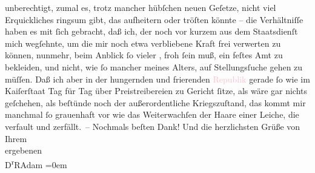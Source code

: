                    unberechtigt, zumal es, trotz mancher hübſchen neuen Geſetze, nicht viel
                    Erquickliches ringsum gibt, das aufheitern oder tröſten könnte – die
                    Verhältniſſe haben es mit ſich gebracht, daß ich, der noch vor kurzem aus dem
                    Staatsdienſt mich wegſehnte, um die mir noch etwa verbliebene Kraft frei
                    verwerten zu können, nunmehr, beim Anblick ſo vieler \label{K_L02315_1v}\label{K_L02315_1h}, froh ſein muß, ein feſtes Amt zu bekleiden, und
                    nicht, wie ſo mancher meines Alters, auf Stel{\pb}lungsſuche gehen zu müſſen. Daß ich
                    aber in der hungernden und frierenden \textcolor{pink}{Republik}{} gerade ſo wie im Kaiſerſtaat Tag für Tag
                    über Preistreibereien zu Gericht ſitze, als wäre gar nichts geſchehen, als
                    beſtünde noch der außerordentliche Kriegszuſtand, das kommt mir manchmal ſo
                    grauenhaft vor wie das Weiterwachſen der Haare einer Leiche, die verfault und
                    zerfällt. –\pend
           \pstart
           Nochmals beſten Dank! Und die herzlichsten Grüße von Ihrem{\\[\baselineskip]}ergebenen{\\[\baselineskip]}\spacefill\mbox{D\textsuperscript{r}RAdam}\pend
           \leftskip=0em{}\endnumbering{}  
      